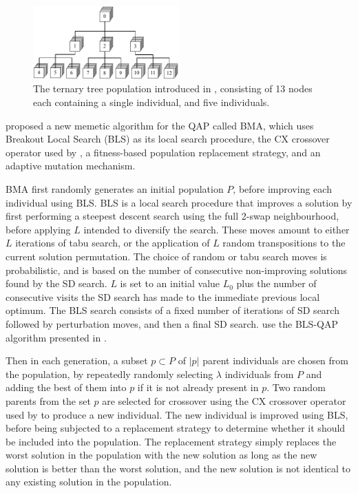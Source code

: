 {	\begin{figure}
		\centering
		\includegraphics[width=0.5\textwidth]{resources/ternary-tree.pdf}%
		\caption{The ternary tree population introduced in \citet{Inostroza:2008md}, consisting of 13 nodes each containing a single  individual, and five  individuals.}
		\label{fig:ternary-tree}
	\end{figure}



	\citet{Benlic:2015gp} proposed a new memetic algorithm for the QAP called BMA, which uses Breakout Local Search (BLS) as its local search procedure, the CX crossover operator used by \citet{Merz:2000ek}, a fitness-based population replacement strategy, and an adaptive mutation mechanism.

	BMA first randomly generates an initial population \(P\), before improving each individual using BLS.
	BLS is a local search procedure that improves a solution by first performing a steepest descent search using the full 2-swap neighbourhood, before applying \(L\)  intended to diversify the search. These moves amount to either \(L\) iterations of tabu search, or the application of \(L\) random transpositions to the current solution permutation. The choice of random or tabu search moves is probabilistic, and is based on the number of consecutive non-improving solutions found by the SD search. \(L\) is set to an initial value \(L_0\) plus the number of consecutive visits the SD search has made to the immediate previous local optimum.
	The BLS search consists of a fixed number of iterations of SD search followed by perturbation moves, and then a final SD search.
	\citeauthor{Benlic:2015gp} use the BLS-QAP algorithm presented in \citet{Benlic:2013gi}.

	Then in each generation, a subset \(p \subset P\) of \(|p|\) parent individuals are chosen from the population, by repeatedly randomly selecting \(\lambda\) individuals from \(P\) and adding the best of them into \(p\) if it is not already present in \(p\).
	Two random parents from the set \(p\) are selected for crossover using the CX crossover operator used by \citet{Merz:2000ek} to produce a new individual. %
	The new individual is improved using BLS, before being subjected to a replacement strategy to determine whether it should be included into the population. The replacement strategy simply replaces the worst solution in the population with the new solution as long as the new solution is better than the worst solution, and the new solution is not identical to any existing solution in the population.

}
